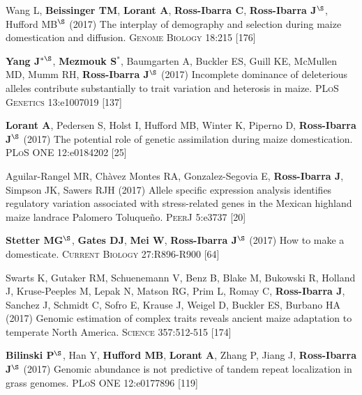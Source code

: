 \documentclass[letterpaper,10pt]{article}
\begin{document}
\begin{etaremune}
\item Wang L, \textbf{Beissinger TM}, \textbf{Lorant A}, \textbf{Ross-Ibarra C}, \textbf{Ross-Ibarra J}$^\S$, Hufford MB$^\S$ (2017) The interplay of demography and selection during maize domestication and diffusion. \textsc{Genome Biology} 18:215
 [176]\\

\item {\bf Yang J}$^{*\S}$, {\bf Mezmouk S}$^*$, Baumgarten A, Buckler ES, Guill KE, McMullen MD, Mumm RH, {\bf Ross-Ibarra J}$^\S$ (2017) Incomplete dominance of deleterious alleles contribute substantially to trait variation and heterosis in maize. \textsc{PLoS Genetics} 13:e1007019
 [137]\\

\item \textbf{Lorant A}, Pedersen S, Holst I, Hufford MB, Winter K, Piperno D, \textbf{Ross-Ibarra J}$^\S$ (2017) The potential role of genetic assimilation during maize domestication. \textsc{PLoS ONE} 12:e0184202
 [25]\\

\item Aguilar-Rangel MR, Ch\`{a}vez Montes RA,  Gonzalez-Segovia E, \textbf{Ross-Ibarra J}, Simpson JK, Sawers RJH (2017) Allele specific expression analysis identifies regulatory variation associated with stress-related genes in the Mexican highland maize landrace Palomero Toluque\~{n}o. \textsc{PeerJ} 5:e3737
 [20]\\

\item   {\bf Stetter MG}$^\S$, {\bf Gates DJ}, {\bf Mei W}, {\bf Ross-Ibarra J}$^\S$ (2017) How to make a domesticate. \textsc{Current Biology} 27:R896-R900
 [64]\\

\item Swarts K, Gutaker RM,   Schuenemann V,  Benz B,  Blake M, Bukowski R, Holland J, Kruse-Peeples M, Lepak N, Matson RG, Prim L, Romay C, {\bf Ross-Ibarra J}, Sanchez J, Schmidt C,  Sofro E,  Krause J,  Weigel D,  Buckler ES,  Burbano HA (2017) Genomic estimation of complex traits reveals ancient maize adaptation to temperate North America. \textsc{Science} 357:512-515
 [174]\\

\item {\bf Bilinski P}$^\S$, Han Y, {\bf Hufford MB}, {\bf Lorant A}, Zhang P, Jiang J, {\bf Ross-Ibarra J}$^\S$ (2017) Genomic abundance is not predictive of tandem repeat localization in grass genomes. \textsc{PLoS ONE} 12:e0177896
 [119]\\


\end{etaremune}
\end{document}
